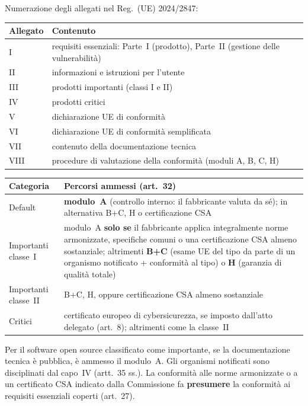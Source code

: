\begin{integrazione}
Numerazione degli allegati nel Reg.~(UE) 2024/2847:
\begin{center}
\small
\begin{tabular}{@{}ll@{}}
\toprule
\textbf{Allegato} & \textbf{Contenuto}\\
\midrule
I & requisiti essenziali: Parte~I (prodotto), Parte~II (gestione delle vulnerabilità)\\
II & informazioni e istruzioni per l'utente\\
III & prodotti importanti (classi I e II)\\
IV & prodotti critici\\
V & dichiarazione UE di conformità\\
VI & dichiarazione UE di conformità semplificata\\
VII & contenuto della documentazione tecnica\\
VIII & procedure di valutazione della conformità (moduli A, B, C, H)\\
\bottomrule
\end{tabular}
\end{center}

\begin{center}
\small
\begin{tabularx}{\linewidth}{>{\raggedright\arraybackslash}p{2.6cm} X}
\toprule
\textbf{Categoria} & \textbf{Percorsi ammessi (art.~32)}\\
\midrule
Default & \textbf{modulo~A} (controllo interno: il fabbricante valuta da sé); in alternativa B+C, H o
  certificazione CSA\\
Importanti classe~I & modulo~A \textbf{solo se} il fabbricante applica integralmente norme armonizzate,
  specifiche comuni o una certificazione CSA almeno sostanziale; altrimenti \textbf{B+C} (esame UE del tipo
  da parte di un organismo notificato + conformità al tipo) o \textbf{H} (garanzia di qualità totale)\\
Importanti classe~II & B+C, H, oppure certificazione CSA almeno sostanziale\\
Critici & certificato europeo di cybersicurezza, se imposto dall'atto delegato (art.~8); altrimenti come
  la classe~II\\
\bottomrule
\end{tabularx}
\end{center}
Per il software open source classificato come importante, se la documentazione tecnica è pubblica, è
ammesso il modulo~A. Gli organismi notificati sono disciplinati dal capo~IV (artt.~35 ss.). La
conformità alle norme armonizzate o a un certificato CSA indicato dalla Commissione fa
\textbf{presumere} la conformità ai requisiti essenziali coperti (art.~27).
\end{integrazione}

